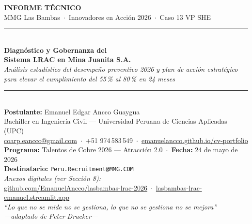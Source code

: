 \documentclass[12pt,a4paper]{article}
\begin{document}
\thispagestyle{empty}
\begin{center}
\vspace*{1cm}
{\large\bfseries INFORME TÉCNICO}\\[0.3cm]
{\normalsize MMG Las Bambas \,$\cdot$\, Innovadores en Acción 2026 \,$\cdot$\, Caso 13 VP SHE}\\[1.2cm]

\rule{14cm}{0.6pt}\\[0.3cm]
{\LARGE\bfseries Diagnóstico y Gobernanza del}\\[0.2cm]
{\LARGE\bfseries Sistema LRAC en Mina Juanita S.A.}\\[0.25cm]
{\itshape Análisis estadístico del desempeño preventivo 2026 y plan de acción estratégico}\\[0.1cm]
{\itshape para elevar el cumplimiento del 55\,\% al 80\,\% en 24 meses}\\[0.3cm]
\rule{14cm}{0.6pt}\\[1.6cm]

\textbf{Postulante:} {\large Emanuel Edgar Ancco Guaygua}\\[0.15cm]
Bachiller en Ingeniería Civil --- Universidad Peruana de Ciencias Aplicadas (UPC)\\[0.1cm]
\href{mailto:coarp.eancco@gmail.com}{coarp.eancco@gmail.com} \,$\cdot$\, +51 974\,583\,549 \,$\cdot$\,
\href{https://emanuelancco.github.io/cv-portfolio/}{emanuelancco.github.io/cv-portfolio}\\[1.4cm]

\textbf{Programa:} Talentos de Cobre 2026 --- Atracción 2.0 \,$\cdot$\,
\textbf{Fecha:} 24 de mayo de 2026\\
\textbf{Destinatario:} \texttt{Peru.Recruitment@MMG.COM}\\[0.5cm]

\small\textit{Anexos digitales (ver Sección 8):}\\
\small\href{https://github.com/EmanuelAncco/lasbambas-lrac-2026}{github.com/EmanuelAncco/lasbambas-lrac-2026} \,$\cdot$\,
\href{https://lasbambas-lrac-emanuel.streamlit.app}{lasbambas-lrac-emanuel.streamlit.app}\\[0.5cm]

\textit{\small ``Lo que no se mide no se gestiona, lo que no se gestiona no se mejora''}\\
\textit{\small ---adaptado de Peter Drucker---}
\end{center}
\vfill
\end{document}
